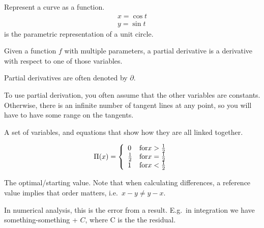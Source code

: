 \begin{definition}[Parameterization]
    Represent a curve as a function.
    \begin{align}
        x = \cos{t} \\
        y = \sin{t}
    \end{align}
    is the parametric representation of a unit circle.

\begin{definition}
    Given a function $f$ with multiple parameters, a partial derivative is a
    derivative with respect to one of those variables.

    Partial derivatives are often denoted by $\partial$.

    To use partial derivation, you often assume that the other variables are 
    constants. Otherwise, there is an infinite number of tangent lines at
    any point, so you will have to have some range on the tangents.

\end{definition}

\end{definition}

\begin{definition}
    A set of variables, and equations that show how they are all linked 
    together.
\end{definition}

\begin{definition}
    $$
    \Pi(x) = \left\{
            \begin{array}{l l}
                0 & \text{for} x > \frac{1}{2} \\
                \frac{1}{2} & \text{for} x = \frac{1}{2} \\
                1 & \text{for} x < \frac{1}{2} \\
            \end{array}
        \right.
    $$
\end{definition}

\begin{definition}
    The optimal/starting value. Note that when calculating differences,
    a reference value implies that order matters, i.e.\ $x - y \neq y - x$.

\end{definition}

\begin{definition}[Residual]
    In numerical analysis, this is the error from a result.
    E.g.\ in integration we have something-something + $C$, where C is the 
    the residual.

\end{definition}

